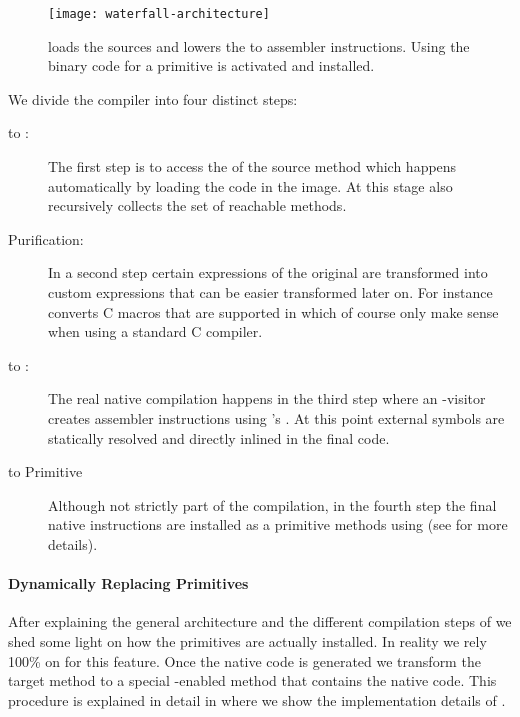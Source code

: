 \begin{figure}[h]
	\centering
	\texttt{[image: waterfall-architecture]}
	\caption[\WF Compilation Steps]{
	\WF loads the \Slang sources and lowers the \AST to assembler instructions.
	Using \B the binary code for a primitive is activated and installed.}
\end{figure}


\noindent We divide the \WF compiler into four distinct steps:
\begin{description}
\item[\Slang to \AST:] The first step is to access the \AST of the \Slang source method which happens automatically by loading the \Slang code in the \PH image.
At this stage \WF also recursively collects the set of reachable \Slang methods.


\item[\AST Purification:] In a second step certain expressions of the original \Slang \AST are transformed into custom \WF expressions that can be easier transformed later on.
For instance \WF converts C macros that are supported in \Slang which of course only make sense when using a standard C compiler.

\item[\AST to \ASM:] The real native compilation happens in the third step where an \AST-visitor creates assembler instructions using \B's \AsmJIT.
At this point external symbols are statically resolved and directly inlined in the final \ASM code.

\item[\ASM to Primitive] Although not strictly part of the compilation, in the fourth step the final native instructions are installed as a primitive methods using \B (see  for more details).
\end{description}


\paragraph{Dynamically Replacing Primitives}
After explaining the general architecture and the different compilation steps of \WF we shed some light on how the primitives are actually installed.
In reality we rely 100\% on \B for this feature.
Once the native code is generated we transform the target method to a special \B-enabled method that contains the native code.
This procedure is explained in detail in  where we show the implementation details of \B.

